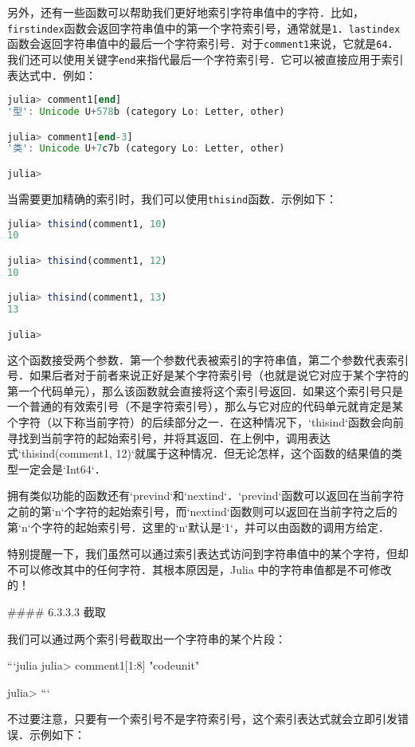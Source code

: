 另外，还有一些函数可以帮助我们更好地索引字符串值中的字符．比如，\verb|firstindex|函数会返回字符串值中的第一个字符索引号，通常就是\verb|1|．\verb|lastindex|函数会返回字符串值中的最后一个字符索引号．对于\verb|comment1|来说，它就是\verb|64|．我们还可以使用关键字\verb|end|来指代最后一个字符索引号．它可以被直接应用于索引表达式中．例如：
\begin{lstlisting}[language=julia]
julia> comment1[end]
'型': Unicode U+578b (category Lo: Letter, other)

julia> comment1[end-3]
'类': Unicode U+7c7b (category Lo: Letter, other)

julia> 
\end{lstlisting}

当需要更加精确的索引时，我们可以使用\verb|thisind|函数．示例如下：
\begin{lstlisting}[language=julia]
julia> thisind(comment1, 10)
10

julia> thisind(comment1, 12)
10

julia> thisind(comment1, 13)
13

julia> 
\end{lstlisting}

这个函数接受两个参数．第一个参数代表被索引的字符串值，第二个参数代表索引号．如果后者对于前者来说正好是某个字符索引号（也就是说它对应于某个字符的第一个代码单元），那么该函数就会直接将这个索引号返回．如果这个索引号只是一个普通的有效索引号（不是字符索引号），那么与它对应的代码单元就肯定是某个字符（以下称当前字符）的后续部分之一．在这种情况下，`thisind`函数会向前寻找到当前字符的起始索引号，并将其返回．在上例中，调用表达式`thisind(comment1, 12)`就属于这种情况．但无论怎样，这个函数的结果值的类型一定会是`Int64`．

拥有类似功能的函数还有`prevind`和`nextind`．`prevind`函数可以返回在当前字符之前的第`n`个字符的起始索引号，而`nextind`函数则可以返回在当前字符之后的第`n`个字符的起始索引号．这里的`n`默认是`1`，并可以由函数的调用方给定．

特别提醒一下，我们虽然可以通过索引表达式访问到字符串值中的某个字符，但却不可以修改其中的任何字符．其根本原因是，Julia 中的字符串值都是不可修改的！

#### 6.3.3.3 截取

我们可以通过两个索引号截取出一个字符串的某个片段：

```julia
julia> comment1[1:8]
"codeunit"

julia> 
```

不过要注意，只要有一个索引号不是字符索引号，这个索引表达式就会立即引发错误．示例如下：

